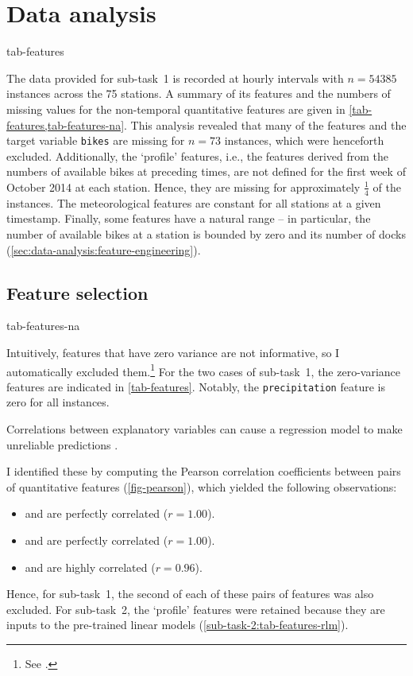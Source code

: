 \section{Data analysis}
\label{sec:data-analysis}

{tab-features}

The data provided for sub-task~1 is recorded at hourly intervals with $n = 54385$
instances across the 75 stations.
A summary of its features and the numbers of missing values for the non-temporal
quantitative features are given in \cref{tab-features,tab-features-na}.
This analysis revealed that many of the features and the target variable \texttt{bikes}
are missing for $n = 73$ instances, which were henceforth excluded.
Additionally, the `profile' features, i.e., the features derived from the numbers of
available bikes at preceding times, are not defined for the first week of October 2014
at each station.
Hence, they are missing for approximately $\frac{1}{4}$ of the instances.
The meteorological features are constant for all stations at a given timestamp.
Finally, some features have a natural range -- in particular, the number of available
bikes at a station is bounded by zero and its number of docks
(\cref{sec:data-analysis:feature-engineering}).

\subsection{Feature selection}
\label{sec:data-analysis:feature-selection}

{tab-features-na}

Intuitively, features that have zero variance are not informative, so I automatically
excluded them.\footnote{See .
}
For the two cases of sub-task~1, the zero-variance features are indicated in
\cref{tab-features}.
Notably, the \texttt{precipitation} feature is zero for all instances.

Correlations between explanatory variables can cause a regression model to make
unreliable predictions \parencite{Alin2010}.
\begin{samepage}
  I identified these by computing the Pearson correlation
  coefficients between pairs of quantitative features (\cref{fig-pearson}), which
  yielded the following observations:
  \begin{itemize}
    \item \texttt{\bikesavgfull} and \texttt{\bikesavgshort} are perfectly correlated ($r = 1.00$).
    \item \texttt{\bikeshdiffavgfull} and \texttt{\bikeshdiffavgshort} are perfectly correlated ($r  = 1.00$).
    \item \texttt{\windspeedmax} and \texttt{\windspeedavg} are highly correlated ($r = 0.96$).
  \end{itemize}
\end{samepage}
Hence, for sub-task~1, the second of each of these pairs of features was also excluded.
For sub-task~2, the `profile' features were retained because they are inputs to the
pre-trained linear models (\cref{sub-task-2:tab-features-rlm}).

